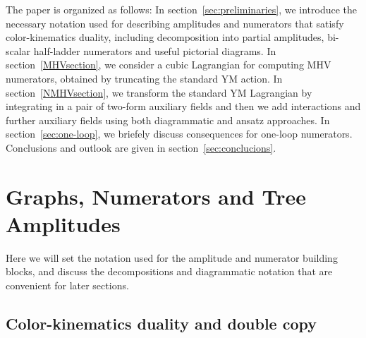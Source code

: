 \documentclass[11pt,a4paper]{article}
\begin{document}
The paper is organized as follows: In section~\ref{sec:preliminaries}, we introduce the necessary notation used for describing amplitudes and numerators that satisfy color-kinematics duality, including decomposition into partial amplitudes, bi-scalar half-ladder numerators and useful pictorial diagrams. In section~\ref{MHVsection}, we consider a cubic Lagrangian for computing MHV numerators, obtained by truncating the standard YM action. In section~\ref{NMHVsection}, we transform the standard YM Lagrangian by integrating in a pair of two-form auxiliary fields and then we add interactions and further auxiliary fields using both diagrammatic and ansatz approaches.  In section~\ref{sec:one-loop}, we  briefely discuss consequences for one-loop numerators.  Conclusions and outlook are given in section~\ref{sec:conclucions}.

\section{Graphs, Numerators and Tree Amplitudes \label{sec:preliminaries}}

Here we will set the notation used for the amplitude and numerator building blocks, and discuss the decompositions and diagrammatic notation that are convenient for later sections.  

\subsection{Color-kinematics duality and double copy}
\end{document}
